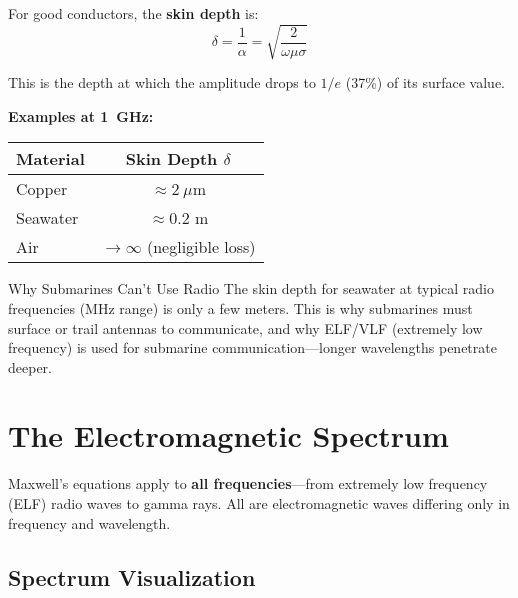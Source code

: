 For good conductors, the \textbf{skin depth} is:
\begin{equation}
\delta = \frac{1}{\alpha} = \sqrt{\frac{2}{\omega\mu\sigma}}
\label{eq:skin-depth}
\end{equation}

This is the depth at which the amplitude drops to $1/e$ (37\%) of its surface value.

\textbf{Examples at 1~GHz:}
\begin{center}
\begin{tabular}{@{}lc@{}}
\toprule
Material & Skin Depth $\delta$ \\
\midrule
Copper & $\approx 2~\mu$m \\
Seawater & $\approx 0.2$ m \\
Air & $\rightarrow \infty$ (negligible loss) \\
\bottomrule
\end{tabular}
\end{center}

\begin{calloutbox}{Why Submarines Can't Use Radio}
The skin depth for seawater at typical radio frequencies (MHz range) is only a few meters. This is why submarines must surface or trail antennas to communicate, and why ELF/VLF (extremely low frequency) is used for submarine communication---longer wavelengths penetrate deeper.
\end{calloutbox}

\section{The Electromagnetic Spectrum}

Maxwell's equations apply to \textbf{all frequencies}---from extremely low frequency (ELF) radio waves to gamma rays. All are electromagnetic waves differing only in frequency and wavelength.

\subsection{Spectrum Visualization}

